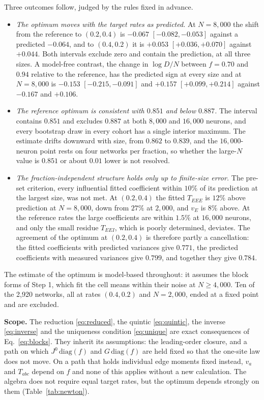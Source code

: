 \documentclass[11pt]{article}
\begin{document}
Three outcomes follow, judged by the rules fixed in advance.
\begin{itemize}
 \item \emph{The optimum moves with the target rates as predicted.} At $N=8{,}000$ the shift from the reference to $(0.2,0.4)$ is $-0.067$ $[-0.082,-0.053]$ against a predicted $-0.064$, and to $(0.4,0.2)$ it is $+0.053$ $[+0.036,+0.070]$ against $+0.044$. Both intervals exclude zero and contain the prediction, at all three sizes. A model-free contrast, the change in $\log D/N$ between $f=0.70$ and $0.94$ relative to the reference, has the predicted sign at every size and at $N=8{,}000$ is $-0.153$ $[-0.215,-0.091]$ and $+0.157$ $[+0.099,+0.214]$ against $-0.167$ and $+0.106$.
 \item \emph{The reference optimum is consistent with $0.851$ and below $0.887$.} The interval contains $0.851$ and excludes $0.887$ at both $8{,}000$ and $16{,}000$ neurons, and every bootstrap draw in every cohort has a single interior maximum. The estimate drifts downward with size, from $0.862$ to $0.839$, and the $16{,}000$-neuron point rests on four networks per fraction, so whether the large-$N$ value is $0.851$ or about $0.01$ lower is not resolved.
 \item \emph{The fraction-independent structure holds only up to finite-size error.} The pre-set criterion, every influential fitted coefficient within $10\%$ of its prediction at the largest size, was not met. At $(0.2,0.4)$ the fitted $T_{EEE}$ is $12\%$ above prediction at $N=8{,}000$, down from $27\%$ at $2{,}000$, and $v_E$ is $8\%$ above. At the reference rates the large coefficients are within $1.5\%$ at $16{,}000$ neurons, and only the small residue $T_{EEI}$, which is poorly determined, deviates. The agreement of the optimum at $(0.2,0.4)$ is therefore partly a cancellation: the fitted coefficients with predicted variances give $0.771$, the predicted coefficients with measured variances give $0.799$, and together they give $0.784$.
\end{itemize}
The estimate of the optimum is model-based throughout: it assumes the block forms of Step 1, which fit the cell means within their noise at $N\ge4{,}000$. Ten of the 2{,}920 networks, all at rates $(0.4,0.2)$ and $N=2{,}000$, ended at a fixed point and are excluded.

\textbf{Scope.} The reduction \eqref{eq:reduced}, the quintic \eqref{eq:quintic}, the inverse \eqref{eq:inverse} and the uniqueness condition \eqref{eq:unique} are exact consequences of Eq.~\eqref{eq:blocks}. They inherit its assumptions: the leading-order closure, and a path on which $J^0\,\mathrm{diag}(f)$ and $G\,\mathrm{diag}(f)$ are held fixed so that the one-site law does not move. On a path that holds individual edge moments fixed instead, $v_a$ and $T_{abc}$ depend on $f$ and none of this applies without a new calculation. The algebra does not require equal target rates, but the optimum depends strongly on them (Table~\ref{tab:newton}).
\end{document}
